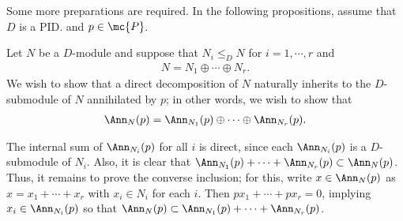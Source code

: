Some more preparations are required.
In the following propositions, assume that $D$ is a PID. and $p\in\mc{P}$.
\begin{obs}\label{inheritance of a direct decomposition}
    Let $N$ be a $D$-module and suppose that $N_i\leq_D N$ for $i=1, \cdots, r$ and
    \begin{align*}
        N=N_1\oplus\cdots\oplus N_r.
    \end{align*}
    We wish to show that a direct decomposition of $N$ naturally inherits to the $D$-submodule of $N$ annihilated by $p$; in other words, we wish to show that
    \begin{align*}
        \Ann_N(p)=\Ann_{N_1}(p)\oplus\cdots\oplus\Ann_{N_r}(p).
    \end{align*}
    
    The internal sum of $\Ann_{N_i}(p)$ for all $i$ is direct, since each $\Ann_{N_i}(p)$ is a $D$-submodule of $N_i$.
    Also, it is clear that $\Ann_{N_1}(p)+\cdots+\Ann_{N_r}(p)\subset\Ann_N(p)$.
    Thus, it remains to prove the converse inclusion; for this, write $x\in\Ann_N(p)$ as $x=x_1+\cdots+x_r$ with $x_i\in N_i$ for each $i$.
    Then $px_1+\cdots+px_r=0$, implying $x_i\in\Ann_{N_i}(p)$ so that $\Ann_N(p)\subset\Ann_{N_1}(p)+\cdots+\Ann_{N_r}(p)$.
\end{obs}    
